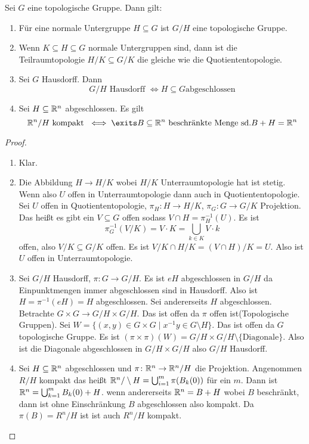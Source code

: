 \begin{Lemma}
    Sei \(G\) eine topologische Gruppe. Dann gilt:
    \begin{enumerate}
        \item Für eine normale Untergruppe \(H\subseteq G\) ist \(G/H\) eine topologische Gruppe.
        \item Wenn \(K\subseteq H\subseteq G\) normale Untergruppen sind, dann ist die 
        Teilraumtopologie \(H/K\subseteq G/K\) die gleiche wie die Quotiententopologie.
        \item Sei \(G\) Hausdorff. Dann \[G/H\text{ Hausdorff } \iff H\subseteq G \text{abgeschlossen}\] 
        \item Sei \(H\subseteq \mathbb{R}^n\) abgeschlossen. Es gilt 
        \[\RR^n/H \text{ kompakt } \iff \exits B\subseteq \RR^n \text{ beschränkte Menge sd.} B+H=\RR^n\] 
    \end{enumerate}
\end{Lemma}
\begin{proof}
    \begin{enumerate}
        \item Klar.
        \item Die Abbildung \(H\to H/K\) wobei \(H/K\) Unterraumtopologie hat ist stetig.
        Wenn also \(U\) offen in Unterraumtopologie dann auch in Quotiententopologie.
        Sei \(U\) offen in Quotiententopologie, \(\pi_H\colon H\to H/K\), \(\pi_G\colon G\to G/K\) Projektion.
        Das heißt es gibt ein \(V\subseteq G\) offen sodass \(V\cap H=\pi_H^{-1}(U)\).
        Es ist \[\pi_G^{-1}(V/K)=V\cdot K=\bigcup_{k\in K}V\cdot k\] offen, also
        \(V/K\subseteq G/K\) offen.
        Es ist \(V/K \cap H/K=(V\cap H)/K=U\). 
        Also ist \(U\) offen in Unterraumtopologie.
        \item Sei \(G/H\) Hausdorff, \(\pi\colon G\to G/H\). Es ist \(eH\) abgeschlossen in \(G/H\) da Einpunktmengen immer
        abgeschlossen sind in Hausdorff. Also ist \(H=\pi^{-1}(eH)=H\) abgeschlossen.
        Sei andererseits \(H\) abgeschlossen.
        Betrachte \(G\times G\to G/H\times G/H\). Das ist offen da \(\pi\) offen ist(Topologische Gruppen).
        Sei \(W=\{(x,y)\in G\times G\mid x^{-1}y\in G\setminus H\}\). Das ist offen da \(G\) topologische Gruppe.
        Es ist \((\pi\times\pi)(W)=G/H\times G/H \setminus\{\text{Diagonale}\}\).
        Also ist die Diagonale abgeschlossen in \(G/H\times G/H\) also \(G/H\) Hausdorff.
        \item Sei \(H\subseteq \mathbb{R}^n\) abgeschlossen und \(\pi\colon \mathbb{R}^n\to \mathbb{R}^n/H\) die Projektion.
        Angenommen \(R/H\) kompakt das heißt \(\mathbb{R}^n/\setminus H=\bigcup_{i=1}^m\pi(B_k(0))\) für ein \(m\).
        Dann ist \(\mathbb{R}^n=\bigcup_{k=1}^mB_k(0)+H\).
        wenn andererseits \(\mathbb{R}^n=B+H\) wobei \(B\) beschränkt, dann ist ohne Einschränkung \(B\) abgeschlossen also kompakt.
        Da \(\pi(B)=R^n/H\) ist ist auch \(R^n/H\) kompakt.
    \end{enumerate}
\end{proof}
